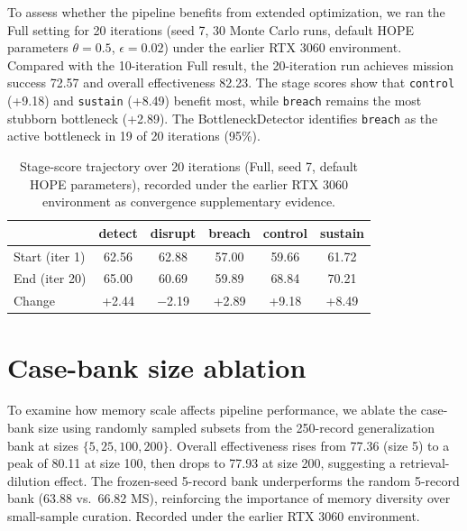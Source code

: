 To assess whether the pipeline benefits from extended optimization, we ran the Full setting for 20 iterations (seed 7, 30 Monte Carlo runs, default HOPE parameters $\theta=0.5$, $\epsilon=0.02$) under the earlier RTX 3060 environment. Compared with the 10-iteration Full result, the 20-iteration run achieves mission success 72.57 and overall effectiveness 82.23. The stage scores show that \texttt{control} (+9.18) and \texttt{sustain} (+8.49) benefit most, while \texttt{breach} remains the most stubborn bottleneck (+2.89). The BottleneckDetector identifies \texttt{breach} as the active bottleneck in 19 of 20 iterations (95\%).

\begin{table}[ht]
\centering
\caption{Stage-score trajectory over 20 iterations (Full, seed 7, default HOPE parameters), recorded under the earlier RTX 3060 environment as convergence supplementary evidence.}
\label{tab:convergence-stage}
\footnotesize
\setlength{\tabcolsep}{4pt}
\begin{tabular}{lccccc}
\toprule
 & detect & disrupt & breach & control & sustain \\
\midrule
Start (iter 1) & 62.56 & 62.88 & 57.00 & 59.66 & 61.72 \\
End (iter 20) & 65.00 & 60.69 & 59.89 & 68.84 & 70.21 \\
Change & +2.44 & $-$2.19 & +2.89 & +9.18 & +8.49 \\
\bottomrule
\end{tabular}
\setlength{\tabcolsep}{6pt}
\end{table}

\section{Case-bank size ablation}
\label{app:casebank}

To examine how memory scale affects pipeline performance, we ablate the case-bank size using randomly sampled subsets from the 250-record generalization bank at sizes $\{5, 25, 100, 200\}$. Overall effectiveness rises from 77.36 (size 5) to a peak of 80.11 at size 100, then drops to 77.93 at size 200, suggesting a retrieval-dilution effect. The frozen-seed 5-record bank underperforms the random 5-record bank (63.88 vs.\ 66.82 MS), reinforcing the importance of memory diversity over small-sample curation. Recorded under the earlier RTX 3060 environment.

